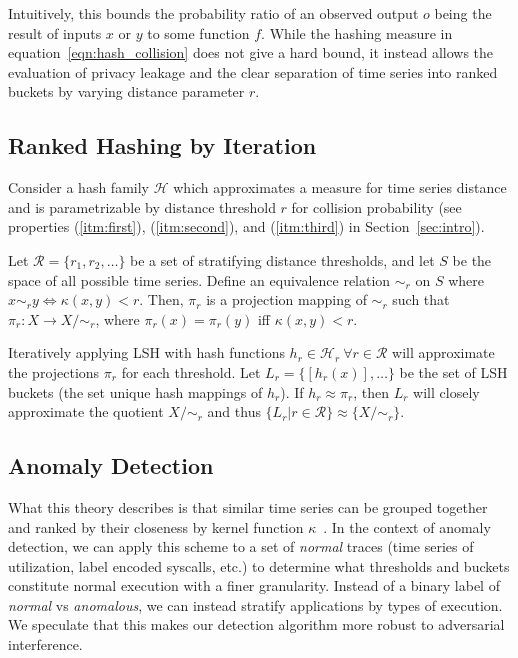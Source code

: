 \documentclass[a4paper]{article}
\begin{document}
Intuitively, this bounds the probability ratio of an observed output $o$ being the result of inputs $x$ or $y$ to some function $f$.
While the hashing measure in equation~\ref{eqn:hash_collision} does not give a hard bound, it instead allows the evaluation of privacy leakage and the clear separation of time series into ranked buckets by varying distance parameter $r$.

\subsection{Ranked Hashing by Iteration}
\label{subsec:ranked_lsh}

Consider a hash family $\mathcal{H}$ which approximates a measure for time series distance and is parametrizable by distance threshold $r$ for collision probability (see properties (\ref{itm:first}), (\ref{itm:second}), and (\ref{itm:third}) in Section~\ref{sec:intro}).

Let $\mathcal{R} = \{r_1, r_2, \ldots\}$ be a set of stratifying distance thresholds, and let $S$ be the space of all possible time series.
Define an equivalence relation $\sim_r$ on $S$ where $x \sim_r y \Leftrightarrow \kappa(x,y) < r$.
Then, $\pi_r$ is a projection mapping of $\sim_r$ such that $\pi_r \colon X \rightarrow X/\sim_r$, where $\pi_r(x) = \pi_r(y)$ iff $\kappa(x,y) < r$.

Iteratively applying LSH with hash functions $h_r \in \mathcal{H}_r~\forall r\in \mathcal{R}$ will approximate the projections $\pi_r$ for each threshold.
Let $L_r = \{[h_r(x)], \ldots \}$ be the set of LSH buckets (the set unique hash mappings of $h_r$).
If $h_r \approx \pi_r$, then $L_r$ will closely approximate the quotient $X/\sim_r$ and thus $\{L_r | r \in \mathcal{R} \} \approx \{X/\sim_r\}$.

\subsection{Anomaly Detection}
\label{subsec:anomaly_detection}

What this theory describes is that similar time series can be grouped together and ranked by their closeness by kernel function $\kappa$~\cite{Hachiya13-NSH}.
In the context of anomaly detection, we can apply this scheme to a set of \textit{normal} traces (time series of utilization, label encoded syscalls, etc.) to determine what thresholds and buckets constitute normal execution with a finer granularity.
Instead of a binary label of \textit{normal} vs \textit{anomalous}, we can instead stratify applications by types of execution.
We speculate that this makes our detection algorithm more robust to adversarial interference.
\end{document}
